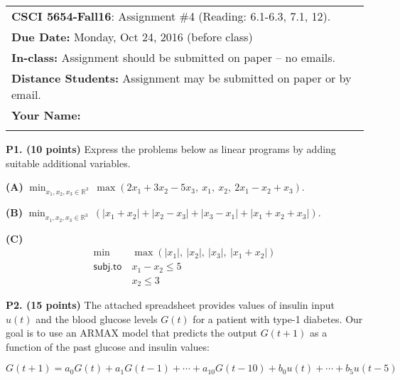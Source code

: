 \documentclass[11pt]{article}
\begin{document}
\begin{tabular}{l}
	\textbf{CSCI 5654-Fall16}: Assignment \#4 (Reading: 6.1-6.3,
  7.1, 12).                                                  \\
	\textbf{Due Date:} Monday, Oct 24, 2016 (before class)            \\
	\textbf{In-class:} Assignment should be submitted on paper -- no emails. \\
	\textbf{Distance Students:} Assignment may be submitted on paper or
	by email.                                                                \\[10pt]

	\textbf{Your Name:} \phantom{Supercalifragilisticexpialidocius Smith}    \\
	\hline
	                                                                         \\[10pt]
\end{tabular}

\noindent\textbf{P1. (10 points)}  Express the problems below as linear
programs by adding suitable additional variables.

\bigskip

\noindent\textbf{(A)} $\min_{x_1, x_2, x_3 \in \mathbb{R}^3}\ \max( 2 x_1 + 3 x_2 - 5 x_3,\ x_1,\ x_2,\ 2
x_1 - x_2 + x_3)$.

\medskip 

\noindent\textbf{(B)} $\min_{x_1, x_2, x_3 \in \mathbb{R}^3}\ \left(
  |x_1 + x_2| + | x_2 - x_3 | + | x_3 - x_1 | + | x_1 + x_2 + x_3 |
\right) $.

\medskip

\noindent\textbf{(C)} \[ \begin{array}{rl}
\min\ & \max\left( | x_1 | ,\ |x_2| ,\ |x_3|,\ |x_1+
  x_2 | \right) \\
 \mathsf{subj. to}\ & x_1 - x_2 \leq 5 \\
&  x_2 \leq 3 \end{array} \]

\bigskip

\noindent\textbf{P2. (15 points)} The attached spreadsheet provides
values of insulin input $u(t)$ and the blood glucose levels $G(t)$ 
for a patient with type-1 diabetes. Our goal is to use an 
ARMAX model that predicts the output $G(t+1)$ as a function of the
past glucose and insulin values:

\[ G(t+1) = a_0 G(t) + a_1 G(t-1) + \cdots + a_{10} G(t - 10) + b_0
  u(t) + \cdots + b_{5} u(t-5) \]
\end{document}
